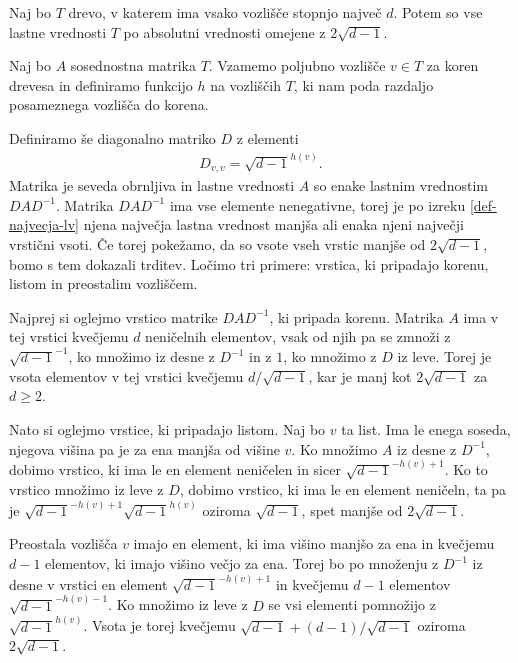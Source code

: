 \begin{izrek}\label{lastne-vrednosti-drevesa}
    Naj bo \(T\) drevo, v katerem ima vsako vozlišče stopnjo največ \(d\). Potem so vse lastne vrednosti \(T\) po absolutni vrednosti omejene z \(2\sqrt{d-1}\).
\end{izrek}
\begin{dokaz}
    Naj bo \(A\) sosednostna matrika \(T\). Vzamemo poljubno vozlišče \(v\in T\) za koren drevesa in definiramo funkcijo \(h\) na vozliščih \(T\), ki nam poda razdaljo posameznega vozlišča do korena.

    Definiramo še diagonalno matriko \(D\) z elementi
    \begin{align*}
        D_{v, v} = \sqrt{d-1}^{h(v)}.
    \end{align*}
    Matrika je seveda obrnljiva in lastne vrednosti \(A\) so enake lastnim vrednostim \(D A D^{-1}\). Matrika \(DAD^{-1}\) ima vse elemente nenegativne, torej je po izreku \ref{def-najvecja-lv} njena največja lastna vrednost manjša ali enaka njeni največji vrstični vsoti. Če torej pokežamo, da so vsote vseh vrstic manjše od \(2\sqrt{d-1}\), bomo s tem dokazali trditev. Ločimo tri primere: vrstica, ki pripadajo korenu, listom in preostalim vozliščem.

    Najprej si oglejmo vrstico matrike \(DAD^{-1}\), ki pripada korenu. Matrika \(A\) ima v tej vrstici kvečjemu \(d\) neničelnih elementov, vsak od njih pa se zmnoži z \(\sqrt{d-1}^{-1}\), ko množimo iz desne z \(D^{-1}\) in z \(1\), ko množimo z \(D\) iz leve. Torej je vsota elementov v tej vrstici kvečjemu \(d/\sqrt{d-1}\), kar je manj kot \(2\sqrt{d-1}\) za \(d\geq 2\).

    Nato si oglejmo vrstice, ki pripadajo listom. Naj bo \(v\) ta list. Ima le enega soseda, njegova višina pa je za ena manjša od višine \(v\). Ko množimo \(A\) iz desne z \(D^{-1}\), dobimo vrstico, ki ima le en element neničelen in sicer \(\sqrt{d-1}^{-h(v)+1}\). Ko to vrstico množimo iz leve z \(D\), dobimo vrstico, ki ima le en element neničeln, ta pa je \(\sqrt{d-1}^{-h(v)+1}\sqrt{d-1}^{h(v)}\) oziroma \(\sqrt{d-1}\), spet manjše od \(2\sqrt{d-1}\).

    Preostala vozlišča \(v\) imajo en element, ki ima višino manjšo za ena in kvečjemu \(d-1\) elementov, ki imajo višino večjo za ena. Torej bo po množenju z \(D^{-1}\) iz desne v vrstici en element \(\sqrt{d-1}^{-h(v)+1}\) in kvečjemu \(d-1\) elementov \(\sqrt{d-1}^{-h(v)-1}\). Ko množimo iz leve z \(D\) se vsi elementi pomnožijo z \(\sqrt{d-1}^{h(v)}\). Vsota je torej kvečjemu \(\sqrt{d-1} + (d-1)/\sqrt{d-1}\) oziroma \(2\sqrt{d-1}\).
\end{dokaz}

